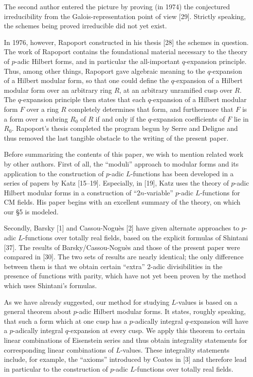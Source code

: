 \documentclass[12pt,a4paper]{article}
\theoremstyle{plain}
\theoremstyle{definition}
\begin{document}
The second author entered the picture by proving (in 1974) the conjectured irreducibility from the Galois-representation point of view [29]. Strictly speaking, the schemes being proved irreducible did not yet exist.

In 1976, however, Rapoport constructed in his thesis [28] the schemes in question. The work of Rapoport contains the foundational material necessary to the theory of $p$-adic Hilbert forms, and in particular the all-important $q$-expansion principle. Thus, among other things, Rapoport gave algebraic meaning to the $q$-expansion of a Hilbert modular form, so that one could define the $q$-expansion of a Hilbert modular form over an arbitrary ring $R$, at an arbitrary unramified cusp over $R$. The $q$-expansion principle then states that each $q$-expansion of a Hilbert modular form $F$ over a ring $R$ completely determines that form, and furthermore that $F$ is a form over a subring $R_0$ of $R$ if and only if the $q$-expansion coefficients of $F$ lie in $R_0$. Rapoport's thesis completed the program begun by Serre and Deligne and thus removed the last tangible obstacle to the writing of the present paper.

Before summarizing the contents of this paper, we wish to mention related work by other authors. First of all, the ``moduli'' approach to modular forms and its application to the construction of $p$-adic $L$-functions has been developed in a series of papers by Katz [15--19]. Especially, in [19], Katz uses the theory of $p$-adic Hilbert modular forms in a construction of ``$2n$-variable'' $p$-adic $L$-functions for CM fields. His paper begins with an excellent summary of the theory, on which our \S5 is modeled.

Secondly, Barsky [1] and Cassou-Nogu\`es [2] have given alternate approaches to $p$-adic $L$-functions over totally real fields, based on the explicit formulas of Shintani [37]. The results of Barsky/Cassou-Nogu\`es and those of the present paper were compared in [30]. The two sets of results are nearly identical; the only difference between them is that we obtain certain ``extra'' 2-adic divisibilities in the presence of functions with parity, which have not yet been proven by the method which uses Shintani's formulas.

As we have already suggested, our method for studying $L$-values is based on a general theorem about $p$-adic Hilbert modular forms. It states, roughly speaking, that such a form which at one cusp has a $p$-adically integral $q$-expansion will have a $p$-adically integral $q$-expansion at every cusp. We apply this theorem to certain linear combinations of Eisenstein series and thus obtain integrality statements for corresponding linear combinations of $L$-values. These integrality statements include, for example, the ``axioms'' introduced by Coates in [3] and therefore lead in particular to the construction of $p$-adic $L$-functions over totally real fields.
\end{document}
